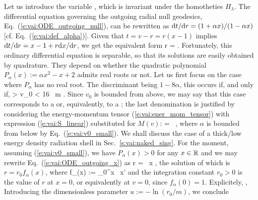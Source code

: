 Let us introduce the variable
\be \label{e:vai:def_x_v_r}
    ,
\ee
which is invariant under the homotheties $H_\lambda$.
The differential equation governing the outgoing radial null
geodesics, Eq.~(\ref{e:vai:ODE_outgoing_null}),
can be rewritten as $\mathrm{d} t / \mathrm{d} r = (1 + \alpha x)/(1 - \alpha x)$ [cf. Eq.~(\ref{e:vai:def_alpha})].
Given that $t = v - r = r(x - 1)$ implies $\mathrm{d} t / \mathrm{d} r = x - 1 + r \mathrm{d} x/\mathrm{d} r$,
we get the equivalent form
\be \label{e:vai:ODE_outgoing_x}
    r  =  .
\ee
Fortunately, this ordinary differential equation is separable, so that its
solutions are easily obtained by quadrature. They depend on whether the
quadratic polynomial $P_\alpha(x) := \alpha x^2 - x + 2$ admits real roots
or not.
Let us first focus on the case where $P_\alpha$ has no real root.
The discriminant being $1 - 8\alpha$, this occurs if, and only if,
\be \label{e:vai:v0_small}
    \alpha >  \iff v_0 < 16 \, m .
\ee
Since $v_0$ is bounded from above, we may say that this case corresponds to
a  or, equivalently,
to a ; the last denomination is
justified by considering the energy-momentum tensor (\ref{e:vai:ener_mom_tensor}) with
expression (\ref{e:vai:S_linear}) substituted for $M(v)$:
\be \label{e:vai:T_alpha}
 = \,  \otimes {} ,
\ee
where $\alpha$ is bounded from below by Eq.~(\ref{e:vai:v0_small}).
We shall discuss the case of a thick/low energy density radiation shell
in Sec.~\ref{s:vai:naked_sing}.
For the moment, assuming (\ref{e:vai:v0_small}),
we have $P_\alpha(x) > 0$ for any $x\in\mathbb{R}$ and we may rewrite Eq.~(\ref{e:vai:ODE_outgoing_x})
as
\be \label{e:vai:ODE_outgoing_x_sep}
    \D \ln r = \, \D x ,
\ee
the solution of which is $r = r_0 f_\alpha(x)$, where
\be \label{e:vai:lnf_alpha}
    \ln f_\alpha(x) := \int_0^x \, \D x'
\ee
and the integration constant $r_0>0$ is the value of $r$ at $x=0$, or equivalently
at $v = 0$, since $f_\alpha(0) = 1$.
Explicitely,
\be \label{e:vai:sol_r_x_v0_small}
 ,
\ee
Introducing the dimensionless
parameter $u := - \ln (r_0 / m)$, we conclude
